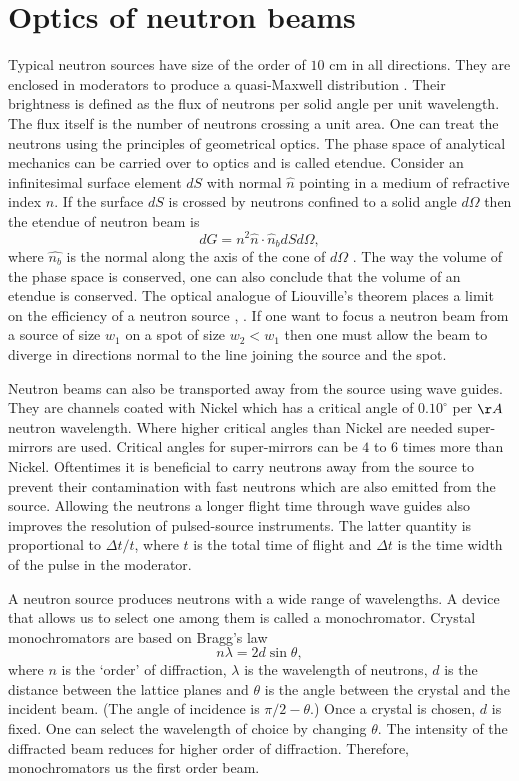 \documentclass{article}
\numberwithin{equation}{section}
\begin{document}
\section{Optics of neutron beams}\label{s7}
Typical neutron sources have size of the order of $10$ cm in all directions.
They are enclosed in moderators to produce a quasi-Maxwell distribution
\cite{anderson2008neutron}. Their brightness is defined as the flux of neutrons
per solid angle per unit wavelength. The flux itself is the number of neutrons
crossing a unit area. One can treat the neutrons using the principles of
geometrical optics. The phase space of analytical mechanics can be carried over
to optics and is called etendue. Consider an infinitesimal surface element 
$dS$ with normal $\hat{n}$ pointing in a medium of refractive index $n$. If
the surface $dS$ is crossed by neutrons confined to a solid angle $d\Omega$
then the etendue of neutron beam is
\begin{equation}\label{s7e1}
dG = n^2\hat{n}\cdot\hat{n}_b dSd\Omega,
\end{equation}
where $\hat{n_b}$ is the normal along the axis of the cone of $d\Omega$ 
\cite{markvart2007thermodynamics}. The way the volume of the phase space is
conserved, one can also conclude that the volume of an etendue is conserved. 
The optical analogue of Liouville's theorem places a limit on the efficiency
of a neutron source \cite{anderson2008neutron}, 
\cite{markvart2007thermodynamics}. If one want to focus a neutron beam from
a source of size $w_1$ on a spot of size $w_2 < w_1$ then one must allow the
beam to diverge in directions normal to the line joining the source and the
spot.

Neutron beams can also be transported away from the source using wave guides.
They are channels coated with Nickel which has a critical angle of $0.10^\circ$
per $\AA$ neutron wavelength. Where higher critical angles than Nickel are 
needed super-mirrors are used. Critical angles for super-mirrors can be $4$
to $6$ times more than Nickel. Oftentimes it is beneficial to carry neutrons
away from the source to prevent their contamination with fast neutrons which
are also emitted from the source. Allowing the neutrons a longer flight time
through wave guides also improves the resolution of pulsed-source instruments.
The latter quantity is proportional to $\Delta t/t$, where $t$ is the total
time of flight and $\Delta t$ is the time width of the pulse in the moderator.

A neutron source produces neutrons with a wide range of wavelengths. A device
that allows us to select one among them is called a monochromator. Crystal
monochromators are based on Bragg's law
\begin{equation}\label{s7e2}
n\lambda = 2d\sin\theta,
\end{equation}
where $n$ is the `order' of diffraction, $\lambda$ is the wavelength of 
neutrons, $d$ is the distance between the lattice planes and $\theta$ is the
angle between the crystal and the incident beam. (The angle of incidence is
$\pi/2 - \theta$.) Once a crystal is chosen, $d$ is fixed. One can select
the wavelength of choice by changing $\theta$. The intensity of the diffracted
beam reduces for higher order of diffraction. Therefore, monochromators us
the first order beam.
\end{document}
